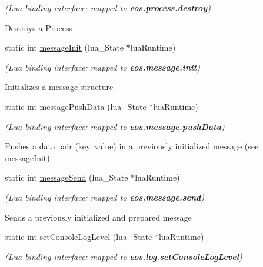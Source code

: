 \begin{CompactItemize}
\begin{CompactList}\small\item\em {\em (Lua binding interface: mapped to {\bf eos.process.destroy})\/}\par
\par
 Destroys a Process \item\end{CompactList}\item 
static int \hyperlink{structEOSKernel_b4212bfe6463d4d660724b74fa23fcca}{messageInit} (lua\_\-State $\ast$luaRuntime)
\begin{CompactList}\small\item\em {\em (Lua binding interface: mapped to {\bf eos.message.init})\/}\par
\par
 Initializes a message structure \item\end{CompactList}\item 
static int \hyperlink{structEOSKernel_a41c8c1590f49342c901ac8e0c055e2c}{messagePushData} (lua\_\-State $\ast$luaRuntime)
\begin{CompactList}\small\item\em {\em (Lua binding interface: mapped to {\bf eos.message.pushData})\/}\par
\par
 Pushes a data pair (key, value) in a previously initialized message (see messageInit) \item\end{CompactList}\item 
static int \hyperlink{structEOSKernel_3d3c99f27856467254fdbc66388e059f}{messageSend} (lua\_\-State $\ast$luaRuntime)
\begin{CompactList}\small\item\em {\em (Lua binding interface: mapped to {\bf eos.message.send})\/}\par
\par
 Sends a previously initialized and prepared message \item\end{CompactList}\item 
static int \hyperlink{structEOSKernel_32cd671874726365523a0ed8f0d21339}{setConsoleLogLevel} (lua\_\-State $\ast$luaRuntime)
\begin{CompactList}\small\item\em {\em (Lua binding interface: mapped to {\bf eos.log.setConsoleLogLevel})\/}\par
\par

\end{CompactList}
\end{CompactItemize}
